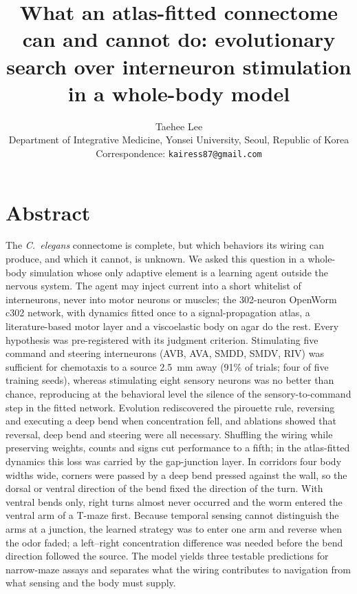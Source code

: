 \documentclass[11pt,a4paper]{article}
\title{\fontsize{15.5}{19}\selectfont What an atlas-fitted connectome can and cannot do: evolutionary search over interneuron stimulation in a whole-body \Ce{} model}
\author{Taehee Lee\\[2pt]
\small Department of Integrative Medicine, Yonsei University, Seoul, Republic of Korea\\
\small Correspondence: \texttt{kairess87@gmail.com}}
\date{}
\newcommand{\Ce}{\textit{C.~elegans}}
\begin{document}
\maketitle

\section*{Abstract}
The \Ce{} connectome is complete, but which behaviors its wiring can produce, and which it cannot, is unknown. We asked this question in a whole-body simulation whose only adaptive element is a learning agent outside the nervous system. The agent may inject current into a short whitelist of interneurons, never into motor neurons or muscles; the 302-neuron OpenWorm c302 network, with dynamics fitted once to a signal-propagation atlas, a literature-based motor layer and a viscoelastic body on agar do the rest. Every hypothesis was pre-registered with its judgment criterion. Stimulating five command and steering interneurons (AVB, AVA, SMDD, SMDV, RIV) was sufficient for chemotaxis to a source 2.5~mm away (91\% of trials; four of five training seeds), whereas stimulating eight sensory neurons was no better than chance, reproducing at the behavioral level the silence of the sensory-to-command step in the fitted network. Evolution rediscovered the pirouette rule, reversing and executing a deep bend when concentration fell, and ablations showed that reversal, deep bend and steering were all necessary. Shuffling the wiring while preserving weights, counts and signs cut performance to a fifth; in the atlas-fitted dynamics this loss was carried by the gap-junction layer. In corridors four body widths wide, corners were passed by a deep bend pressed against the wall, so the dorsal or ventral direction of the bend fixed the direction of the turn. With ventral bends only, right turns almost never occurred and the worm entered the ventral arm of a T-maze first. Because temporal sensing cannot distinguish the arms at a junction, the learned strategy was to enter one arm and reverse when the odor faded; a left--right concentration difference was needed before the bend direction followed the source. The model yields three testable predictions for narrow-maze assays and separates what the wiring contributes to navigation from what sensing and the body must supply.
\end{document}
